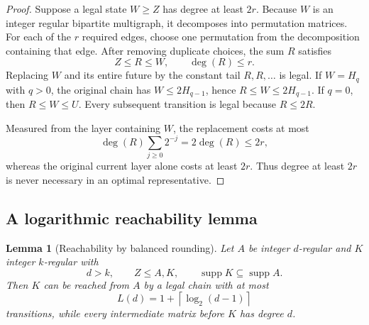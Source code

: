 \documentclass[11pt]{article}
\newtheorem{lemma}[theorem]{Lemma}
\theoremstyle{definition}
\newcommand{\supp}{\operatorname{supp}}
\newcommand{\degm}{\operatorname{deg}}
\begin{document}
\begin{proof}
Suppose a legal state $W\ge Z$ has degree at least $2r$.
Because $W$ is an integer regular bipartite multigraph, it decomposes into permutation matrices.
For each of the $r$ required edges, choose one permutation from the decomposition containing that
edge.  After removing duplicate choices, the sum $R$ satisfies
\[
Z\le R\le W,
\qquad
\degm(R)\le r.
\]
Replacing $W$ and its entire future by the constant tail $R,R,\ldots$ is legal.
If $W=H_q$ with $q>0$, the original chain has $W\le2H_{q-1}$, hence
$R\le W\le2H_{q-1}$.  If $q=0$, then $R\le W\le U$.
Every subsequent transition is legal because $R\le2R$.

Measured from the layer containing $W$, the replacement costs at most
\[
\degm(R)\sum_{j\ge0}2^{-j}
=
2\degm(R)
\le2r,
\]
whereas the original current layer alone costs at least $2r$.
Thus degree at least $2r$ is never necessary in an optimal representative.
\end{proof}

\subsection{A logarithmic reachability lemma}

\begin{lemma}[Reachability by balanced rounding]
\label{lem:reach}
Let $A$ be integer $d$-regular and $K$ integer $k$-regular with
\[
d>k,
\qquad
Z\le A,K,
\qquad
\supp K\subseteq\supp A.
\]
Then $K$ can be reached from $A$ by a legal chain with at most
\[
L(d)
=
1+\left\lceil\log_2(d-1)\right\rceil
\]
transitions, while every intermediate matrix before $K$ has degree $d$.
\end{lemma}
\end{document}
